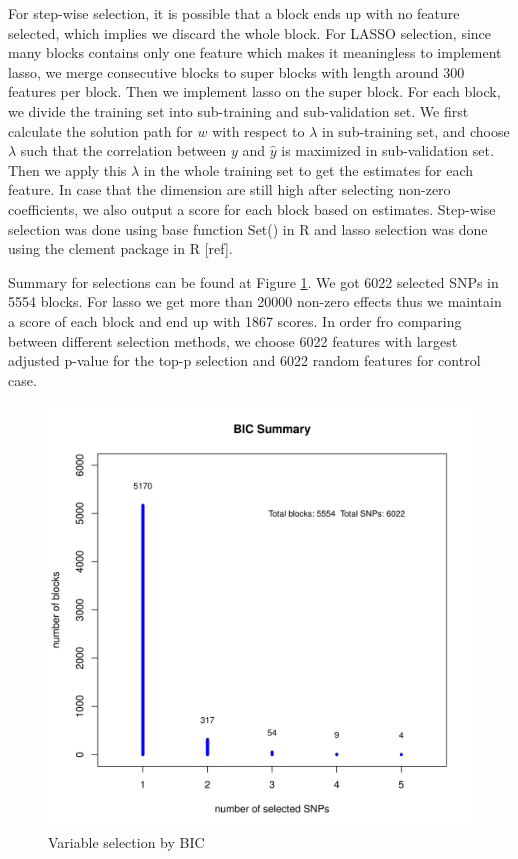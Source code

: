 \documentclass[acmtog, authorversion]{acmart}
\begin{document}
For step-wise selection, it is possible that a block ends up with no feature selected, which implies we discard the whole block. For LASSO selection, since many blocks contains only one feature which makes it meaningless to implement lasso, we merge consecutive blocks to super blocks with length around 300 features per block. Then we implement lasso on the super block. For each block, we divide the training set into sub-training and sub-validation set. We first calculate the solution path for $w$ with respect to $\lambda$ in sub-training set, and choose $\lambda$ such that the correlation between $y$ and $\hat{y}$ is maximized in sub-validation set. Then we apply this $\lambda$ in the whole training set to get the estimates for each feature. In case that the dimension are still high after selecting non-zero coefficients, we also output a score for each block based on estimates. Step-wise selection was done using base function Set() in R and lasso selection was done using the clement package in R [ref].

Summary for selections can be found at Figure {\ref{fig:BIC}}. We got 6022 selected SNPs in 5554 blocks. For lasso we get more than 20000 non-zero effects thus we maintain a score of each block and end up with 1867 scores. In order fro comparing between different selection methods, we choose 6022 features with largest adjusted p-value for the top-p selection and 6022 random features for control case.
\begin{figure}[!h]
  \centering
  \includegraphics[width=3.5 in, trim=0 0 0in 0]{img/BIC_summary}
  \caption{Variable selection by BIC}
  \label{fig:BIC}
\end{figure}
\end{document}
